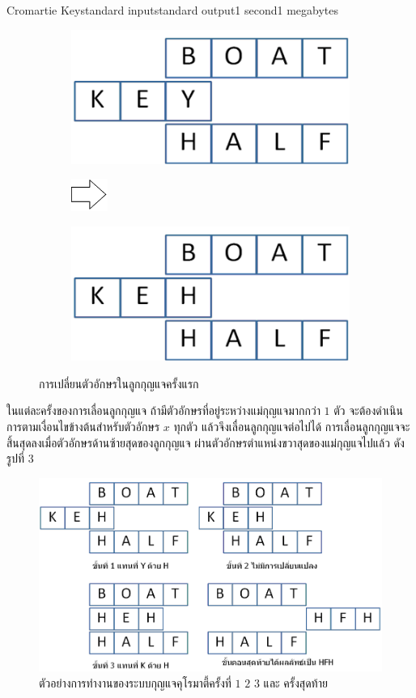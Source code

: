 \documentclass[11pt,a4paper]{article}
\begin{document}
\begin{problem}{Cromartie Key}{standard input}{standard output}{1 second}{1 megabytes}
\begin{figure}[h]
\centering
\begin{subfigure}{30ex}
\centering
\includegraphics[width=25ex]{../latex/img/1062/1062-3.png}
\end{subfigure}%
\begin{subfigure}{20ex}
\centering
\includegraphics[width=5ex]{../latex/img/1062/1062-6.png}
\end{subfigure}%
\begin{subfigure}{30ex}
\centering
\includegraphics[width=25ex]{../latex/img/1062/1062-4.png}
\end{subfigure}%
\caption{การเปลี่ยนตัวอักษรในลูกกุญแจครั้งแรก}
\end{figure}

ในแต่ละครั้งของการเลื่อนลูกกุญแจ ถ้ามีตัวอักษรที่อยู่ระหว่างแม่กุญแจมากกว่า $1$ ตัว จะต้องดำเนินการตามเงื่อนไขข้างต้นสำหรับตัวอักษร $x$ ทุกตัว แล้วจึงเลื่อนลูกกุญแจต่อไปได้ การเลื่อนลูกกุญแจจะสิ้นสุดลงเมื่อตัวอักษรด้านซ้ายสุดของลูกกุญแจ ผ่านตัวอักษรตำแหน่งขวาสุดของแม่กุญแจไปแล้ว ดังรูปที่ 3

\begin{figure}[h!]
\centering
\includegraphics[width=60ex]{../latex/img/1062/1062-5.png}
\caption{ตัวอย่างการทำงานของระบบกุญแจคุโรมาตี้ครั้งที่ $1$ $2$ $3$ และ ครั้งสุดท้าย}
\end{figure}


\end{problem}
\end{document}
